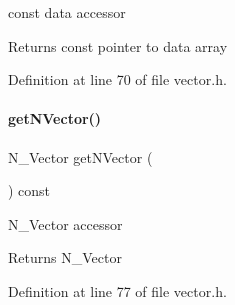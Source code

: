 const data accessor \begin{DoxyReturn}{Returns}
const pointer to data array 
\end{DoxyReturn}


Definition at line 70 of file vector.\+h.

\mbox{\label{classamici_1_1_ami_vector_acf288b105b2fa4520d0d73f828687533}} 
\paragraph{\texorpdfstring{getNVector()}{getNVector()}}
{\footnotesize\ttfamily N\+\_\+\+Vector get\+N\+Vector (\begin{DoxyParamCaption}{ }\end{DoxyParamCaption}) const}

N\+\_\+\+Vector accessor \begin{DoxyReturn}{Returns}
N\+\_\+\+Vector 
\end{DoxyReturn}


Definition at line 77 of file vector.\+h.

